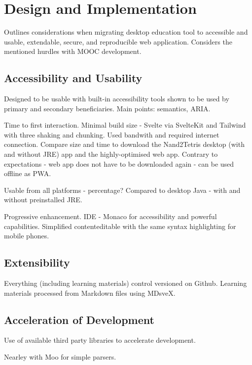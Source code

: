 \chapter{Design and Implementation}


Outlines considerations when migrating desktop education tool to accessible and usable, extendable, secure, and reproducible web application.
Considers the mentioned hurdles with MOOC development.

\section{Accessibility and Usability}

Designed to be usable with built-in accessibility tools shown to be used by primary and secondary beneficiaries.
Main points: semantics, ARIA.

Time to first interaction.
Minimal build size - Svelte via SvelteKit and Tailwind with three shaking and chunking.
Used bandwith and required internet connection.
Compare size and time to download the Nand2Tetris desktop (with and without JRE) app and the highly-optimised web app.
Contrary to expectations - web app does not have to be downloaded again - can be used offline as PWA.

Usable from all platforms - percentage?
Compared to desktop Java - with and without preinstalled JRE.

Progressive enhancement.
IDE - Monaco for accessibility and powerful capabilities.
Simplified contenteditable with the same syntax highlighting for mobile phones.

\section{Extensibility}

Everything (including learning materials) control versioned on Github.
Learning materials processed from Markdown files using MDsveX.

\section{Acceleration of Development}

Use of available third party libraries to accelerate development.

Nearley with Moo for simple parsers.

